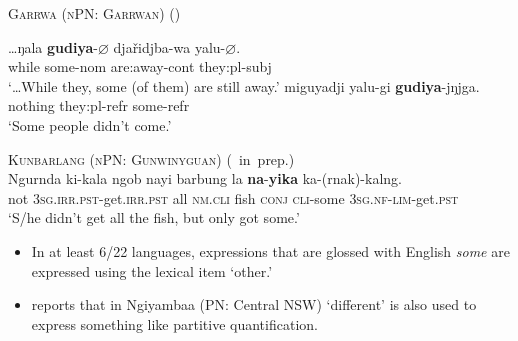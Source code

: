 \documentclass{article}
\begin{document}

\begin{exe}
  \ex \textsc{Garrwa (nPN: Garrwan)} (\citealt[19,37]{furby77})
  \begin{xlist}
    \ex \gll \ldots{}ŋala     \textbf{gudiya}-$\varnothing$    dja\v{r}idjba-wa    yalu-$\varnothing.$\\
    \phantom{\ldots}while     some-{\sc nom}    are:away-{\sc cont}    they:{\sc pl-subj}\\
    \glt   `\ldots{}While they, some (of them) are still away.'
    \ex  \gll  miguyadji    yalu-gi    \textbf{gudiya}-jŋjga. \\
    nothing    they:{\sc pl-refr}    some-{\sc refr} \\
    \glt   `Some people didn’t come.'
  \end{xlist}

  \ex \textsc{Kunbarlang (nPN: Gunwinyguan)} (\citealt{ikthesis}~in~prep.)\\
  \gll Ngurnda ki-kala ngob nayi barbung la \textbf{na}-\textbf{yika} ka-(rnak)-kalng.\\
  not \textsc{3sg.irr.pst}-get.\textsc{irr.pst} all \textsc{nm.cli} fish \textsc{conj} \textsc{cli}-some \textsc{3sg.nf}-\textsc{lim}-get.\textsc{pst}\\
  \glt `S/he didn't get all the fish, but only got some.' %
  
\end{exe}

\begin{itemize}
\item  In at least 6/22 languages, expressions that are glossed with English \textit{some} are expressed using the lexical item `other.' 
\item \citet[73]{donaldson80} reports that in Ngiyambaa (PN: Central NSW) `different' is also used to express something like partitive quantification. %
\end{itemize}
\end{document}
